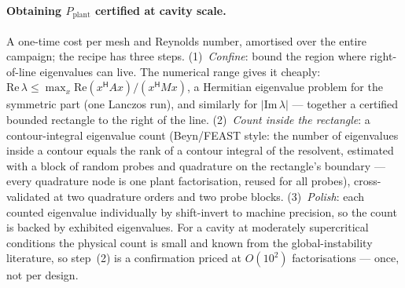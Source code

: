 \documentclass[11pt,a4paper]{article}
\newcommand{\hp}{^{\mathsf H}}
\begin{document}
{\paragraph{Obtaining $P_{\mathrm{plant}}$ certified at cavity scale.}
A one-time cost per mesh and Reynolds number, amortised over the entire campaign; the
recipe has three steps.  (1)~\emph{Confine}: bound the region
where right-of-line eigenvalues can live.  The numerical range gives it cheaply:
$\mathrm{Re}\,\lambda\le\max_x \mathrm{Re}(x\hp Ax)/(x\hp Mx)$, a Hermitian eigenvalue
problem for the symmetric part (one Lanczos run), and similarly for $|\mathrm{Im}\,\lambda|$
--- together a certified bounded rectangle to the right of the line.  (2)~\emph{Count
inside the rectangle}: a contour-integral eigenvalue count (Beyn/FEAST style: the number
of eigenvalues inside a contour equals the rank of a contour integral of the resolvent,
estimated with a block of random probes and quadrature on the rectangle's boundary ---
every quadrature node is one plant factorisation, reused for all probes), cross-validated
at two quadrature orders and two probe blocks.  (3)~\emph{Polish}: each counted eigenvalue
individually by shift-invert to machine precision, so the count is backed by exhibited
eigenvalues.  For a cavity at moderately supercritical conditions the physical count is
small and known from the global-instability literature, so step~(2) is a confirmation
priced at $O(10^2)$ factorisations --- once, not per design.

}
\end{document}
